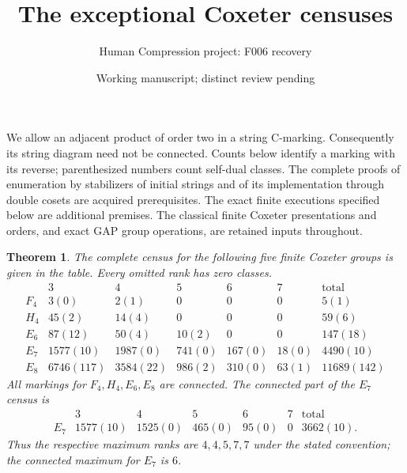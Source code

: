 \documentclass[11pt,a4paper]{article}
\title{The exceptional Coxeter censuses}
\author{Human Compression project: F006 recovery}
\date{Working manuscript; distinct review pending}
\newtheorem{theorem}{Theorem}
\begin{document}
\maketitle
We allow an adjacent product of order two in a string C-marking.
Consequently its string diagram need not be connected. Counts below
identify a marking with its reverse; parenthesized numbers count
self-dual classes. The complete proofs of enumeration by stabilizers
of initial strings and of its implementation through double cosets
are acquired prerequisites. The exact finite executions specified
below are additional premises. The classical finite Coxeter
presentations and orders, and exact GAP group operations, are retained
inputs throughout.

\begin{theorem}\label{census}
The complete census for the following five finite Coxeter groups is
given in the table. Every omitted rank has zero classes.
\[
\begin{array}{c|rrrrr|r}
 &3&4&5&6&7&\text{total}\\\hline
 F_4&3(0)&2(1)&0&0&0&5(1)\\
 H_4&45(2)&14(4)&0&0&0&59(6)\\
 E_6&87(12)&50(4)&10(2)&0&0&147(18)\\
 E_7&1577(10)&1987(0)&741(0)&167(0)&18(0)&4490(10)\\
 E_8&6746(117)&3584(22)&986(2)&310(0)&63(1)&11689(142)
\end{array}
\]
All markings for $F_4,H_4,E_6,E_8$ are connected. The connected
part of the $E_7$ census is
\[
\begin{array}{c|rrrrr|r}
 &3&4&5&6&7&\text{total}\\\hline
 E_7&1577(10)&1525(0)&465(0)&95(0)&0&3662(10).
\end{array}
\]
Thus the respective maximum ranks are $4,4,5,7,7$ under the
stated convention; the connected maximum for $E_7$ is $6$.
\end{theorem}
\end{document}
